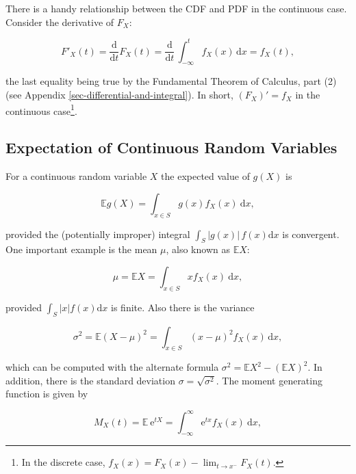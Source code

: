 \documentclass[]{book}
\let\rmarkdownfootnote\footnote%
\def\footnote{\protect\rmarkdownfootnote}
\numberwithin{equation}{chapter}
\numberwithin{figure}{chapter}
\theoremstyle{plain}
\theoremstyle{definition}
\theoremstyle{remark}
\theoremstyle{definition}
\theoremstyle{definition}
\theoremstyle{remark}
\begin{document}
There is a handy relationship between the CDF and PDF in the continuous
case. Consider the derivative of \(F_{X}\):

\begin{equation}
F'_{X}(t)=\frac{\mathrm{d}}{\mathrm{d} t}F_{X}(t)=\frac{\mathrm{d}}{\mathrm{d} t}\,\int_{-\infty}^{t}f_{X}(x)\,\mathrm{d} x=f_{X}(t),
\end{equation}

the last equality being true by the Fundamental Theorem of Calculus,
part (2) (see Appendix \ref{sec-differential-and-integral}). In short,
\((F_{X})'=f_{X}\) in the continuous case\footnote{In the discrete case,
  \(f_{X}(x)=F_{X}(x)-\lim_{t\to x^{-}}F_{X}(t)\).}.

\subsection{Expectation of Continuous Random
Variables}\label{sub-expectation-of-continuous}

For a continuous random variable \(X\) the expected value of \(g(X)\) is

\begin{equation}
\mathbb{E} g(X)=\int_{x\in S}g(x)f_{X}(x)\:\mathrm{d} x,
\end{equation}

provided the (potentially improper) integral
\(\int_{S}|g(x)|\, f(x)\mathrm{d} x\) is convergent. One important
example is the mean \(\mu\), also known as \(\mathbb{E} X\):

\begin{equation}
\mu=\mathbb{E} X=\int_{x\in S}xf_{X}(x)\:\mathrm{d} x,
\end{equation}

provided \(\int_{S}|x|f(x)\mathrm{d} x\) is finite. Also there is the
variance

\begin{equation}
\sigma^{2}=\mathbb{E}(X-\mu)^{2}=\int_{x\in S}(x-\mu)^{2}f_{X}(x)\,\mathrm{d} x,
\end{equation}

which can be computed with the alternate formula
\(\sigma^{2}=\mathbb{E} X^{2}-(\mathbb{E} X)^{2}\). In addition, there
is the standard deviation \(\sigma=\sqrt{\sigma^{2}}\). The moment
generating function is given by

\begin{equation}
M_{X}(t)=\mathbb{E}\:\mathrm{e}^{tX}=\int_{-\infty}^{\infty}\mathrm{e}^{tx}f_{X}(x)\:\mathrm{d} x,
\end{equation}
\end{document}
